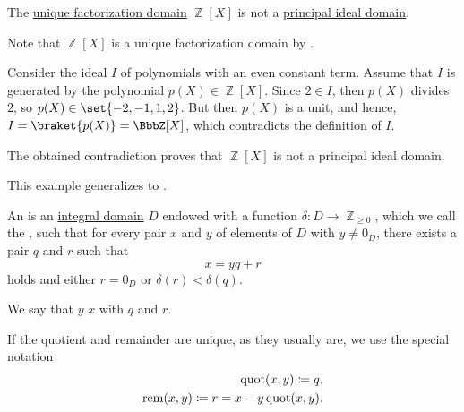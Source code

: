 \begin{example}\label{ex:ufd_but_not_pid}
  The \hyperref[def:unique_factorization_domain]{unique factorization domain} \( \BbbZ[X] \) is not a \hyperref[def:principal_ideal_domain]{principal ideal domain}.

  Note that \( \BbbZ[X] \) is a unique factorization domain by .

  Consider the ideal \( I \) of polynomials with an even constant term. Assume that \( I \) is generated by the polynomial \( p(X) \in \BbbZ[X] \). Since \( 2 \in I \), then \( p(X) \) divides \( 2 \), so \( p(X) \in \set{ -2, -1, 1, 2 } \). But then \( p(X) \) is a unit, and hence, \( I = \braket{p(X)} = \BbbZ[X] \), which contradicts the definition of \( I \).

  The obtained contradiction proves that \( \BbbZ[X] \) is not a principal ideal domain.

  This example generalizes to .
\end{example}

\begin{definition}\label{def:euclidean_domain}
  An  is an \hyperref[def:integral_domain]{integral domain} \( D \) endowed with a function \( \delta: D \to \BbbZ_{\geq 0} \), which we call the , such that for every pair \( x \) and \( y \) of elements of \( D \) with \( y \neq 0_D \), there exists a pair \( q \) and \( r \) such that
  \begin{equation}\label{eq:def:euclidean_domain/division}
    x = yq + r
  \end{equation}
  holds and either \( r = 0_D \) or \( \delta(r) < \delta(q) \).

  We say that \( y \)  \( x \) with  \( q \) and  \( r \).

  If the quotient and remainder are unique, as they usually are, we use the special notation
  \begin{align*}
    \operatorname{quot}(x, y) \coloneqq q, \\
    \operatorname{rem}(x, y) \coloneqq r = x - y \operatorname{quot}(x, y).
  \end{align*}
\end{definition}

